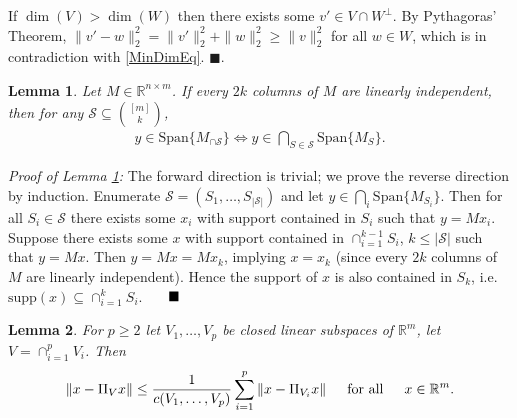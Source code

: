 \documentclass[journal,onecolumn]{IEEEtran}
\newtheorem{lemma}{Lemma}
\begin{document}
If $\dim(V) > \dim(W)$ then there exists some $v' \in V \cap W^\perp$. By Pythagoras' Theorem, $\|v' - w\|_2^2 = \|v'\|_2^2 + \|w\|_2^2 \geq \|v\|_2^2$ for all $w \in W$, which is in contradiction with \eqref{MinDimEq}. \indent $\blacksquare$.


\begin{lemma}\label{SpanIntersectionLemma}
Let $M \in \mathbb{R}^{n \times m}$. If every $2k$ columns of $M$ are linearly independent, then for any $\mathcal{S} \subseteq {[m] \choose k}$,
\begin{align}
y \in \text{Span}\{M_{\cap \mathcal{S}}\}  \Longleftrightarrow y \in \bigcap_{S \in \mathcal{S}} \text{Span}\{M_S\}.
\end{align}
\end{lemma}

\emph{Proof of Lemma \ref{SpanIntersectionLemma}:} The forward direction is trivial; we prove the reverse direction by induction. Enumerate $\mathcal{S} = (S_1, \ldots, S_{|\mathcal{S}|})$ and let $y \in \bigcap_i \text{Span}\{M_{S_i}\}$. Then for all $S_i \in \mathcal{S}$ there exists some $x_i$ with support contained in $S_i$ such that $y = Mx_i$. Suppose there exists some $x$ with support contained in $\cap_{i=1}^{k-1}S_i$, $k \leq |\mathcal{S}|$ such that $y = Mx$. Then $y = Mx = Mx_k$, implying $x = x_k$ (since every $2k$ columns of $M$ are linearly independent). Hence the support of $x$ is also contained in  $S_k$, i.e. $\text{supp}(x) \subseteq \cap_{i=1}^k S_i$. $\indent \blacksquare$



\begin{lemma}\label{DistanceToIntersectionLemma}
For $p \geq 2$ let $V_1, \ldots, V_p$ be closed linear subspaces of $\mathbb{R}^m$, let $V = \cap_{i=1}^p V_i$. Then 
\begin{align}\label{DTILeq}
\|x - \Pi_V x\| \leq \frac{1}{c(V_1, \ldots, V_p)} \sum_{i=1}^p \|x - \Pi_{V_i} x\| \indent \text{for all} \indent x \in \mathbb{R}^m.
\end{align}
\end{lemma}
\end{document}
